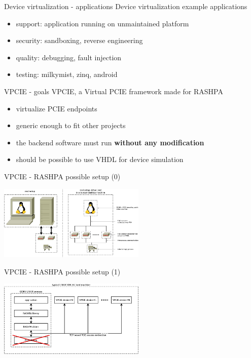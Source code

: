 \documentclass{beamer}
\begin{document}
\begin{frame}{Device virtualization - applications}
  Device virtualization example applications
  \begin{itemize}
  \item support: application running on unmaintained platform
  \item security: sandboxing, reverse engineering
  \item quality: debugging, fault injection
  \item testing: milkymist, zinq, android
  \end{itemize}
\end{frame}

\begin{frame}{VPCIE - goals}
  VPCIE, a Virtual PCIE framework made for RASHPA
  \begin{itemize}
  \item virtualize PCIE endpoints
  \item generic enough to fit other projects
  \item the backend software must run \textbf{without any modification}
  \item should be possible to use VHDL for device simulation
  \end{itemize}
\end{frame}

\begin{frame}{VPCIE - RASHPA possible setup (0)}
  \begin{center}
  \includegraphics[width=70mm]{pic/dv_vpcie/main.jpeg}
  \end{center}
\end{frame}

\begin{frame}{VPCIE - RASHPA possible setup (1)}
  \begin{center}
  \includegraphics[width=70mm]{pic/dv_rashpa/main.jpeg}
  \end{center}
\end{frame}
\end{document}
